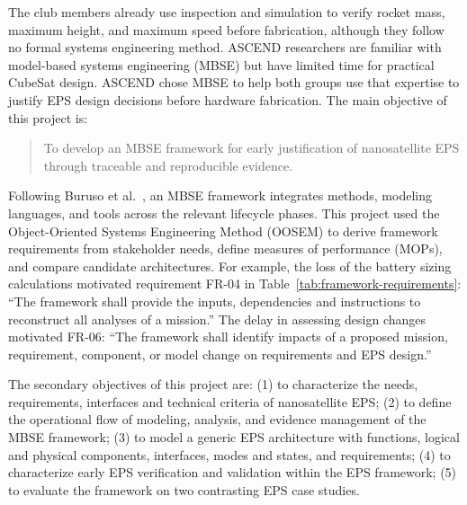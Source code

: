 The club members already use inspection and simulation to verify rocket mass, maximum height, and maximum speed before fabrication, although they follow no formal systems engineering method. ASCEND researchers are familiar with model-based systems engineering (MBSE) but have limited time for practical CubeSat design.
ASCEND chose MBSE to help both groups use that expertise to justify EPS design decisions before hardware fabrication. The main objective of this project is:

\begin{quote}
To develop an MBSE framework for early justification of nanosatellite EPS through traceable and reproducible evidence.
\end{quote}

Following Buruso et al.~\cite{buruso2026modelbased}, an MBSE framework integrates methods, modeling languages, and tools across the relevant lifecycle phases.
This project used the Object-Oriented Systems Engineering Method (OOSEM) to derive framework requirements from stakeholder needs, define measures of performance (MOPs), and compare candidate architectures.
For example, the loss of the battery sizing calculations motivated requirement FR-04 in Table~\ref{tab:framework-requirements}: ``The framework shall provide the inputs, dependencies and instructions to reconstruct all analyses of a mission.''
The delay in assessing design changes motivated FR-06: ``The framework shall identify impacts of a proposed mission, requirement, component, or model change on requirements and EPS design.''

The secondary objectives of this project are: (1) to characterize the needs, requirements, interfaces and technical criteria of nanosatellite EPS; (2) to define the operational flow of modeling, analysis, and evidence management of the MBSE framework; (3) to model a generic EPS architecture with functions, logical and physical components, interfaces, modes and states, and requirements; (4) to characterize early EPS verification and validation within the EPS framework; (5) to evaluate the framework on two contrasting EPS case studies.

